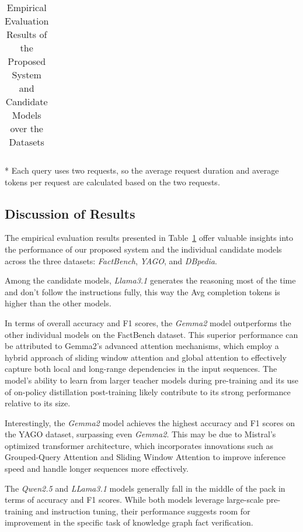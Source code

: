 \begin{table}[ht!]
{\begin{threeparttable}
\begin{tabular}{llccc||cc}
            \bottomrule
        \end{tabular}
        \begin{tablenotes}
            \item[*] Each query uses two requests, so the average request duration and average tokens per request are calculated based on the two requests.
        \end{tablenotes}
        \end{threeparttable}}
    \caption{Empirical Evaluation Results of the Proposed System and Candidate Models over the Datasets}
    \label{tab:evaluation_results-full-wo-category-all-datasets}
\end{table}


\subsection{Discussion of Results}\label{subsec:discussion-of-results}
The empirical evaluation results presented in Table~\ref{tab:evaluation_results-full-wo-category-all-datasets} offer valuable insights into the performance of our proposed system and the individual candidate models across the three datasets: \textit{FactBench}, \textit{YAGO}, and \textit{DBpedia}.

Among the candidate models, \textit{Llama3.1} generates the reasoning most of the time and don't follow the instructions fully, this way the Avg completion tokens is higher than the other models.

In terms of overall accuracy and F1 scores, the \textit{Gemma2} model outperforms the other individual models on the FactBench dataset.
This superior performance can be attributed to Gemma2's advanced attention mechanisms, which employ a hybrid approach of sliding window attention and global attention to effectively capture both local and long-range dependencies in the input sequences.
The model's ability to learn from larger teacher models during pre-training and its use of on-policy distillation post-training likely contribute to its strong performance relative to its size.

Interestingly, the \textit{Gemma2} model achieves the highest accuracy and F1 scores on the YAGO dataset, surpassing even \textit{Gemma2}.
This may be due to Mistral's optimized transformer architecture, which incorporates innovations such as Grouped-Query Attention and Sliding Window Attention to improve inference speed and handle longer sequences more effectively.

The \textit{Qwen2.5} and \textit{LLama3.1} models generally fall in the middle of the pack in terms of accuracy and F1 scores.
While both models leverage large-scale pre-training and instruction tuning, their performance suggests room for improvement in the specific task of knowledge graph fact verification.

